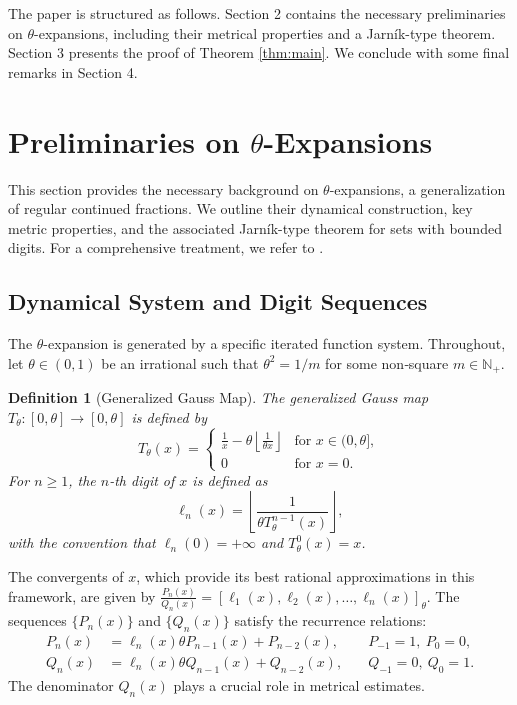 \documentclass{article}
\newtheorem{definition}[theorem]{Definition}
\numberwithin{equation}{section}
\begin{document}
The paper is structured as follows. Section 2 contains the necessary preliminaries on $\theta$-expansions, including their metrical properties and a Jarn\'ik-type theorem. Section 3 presents the proof of Theorem \ref{thm:main}. We conclude with some final remarks in Section 4.


\section{Preliminaries on $\theta$-Expansions}

This section provides the necessary background on $\theta$-expansions, a generalization of regular continued fractions. We outline their dynamical construction, key metric properties, and the associated Jarník-type theorem for sets with bounded digits. For a comprehensive treatment, we refer to \cite{SebeLascuCraiova,Sebe2017,SebeLascu2019,SebeLascu-Springer,SebeLascuBilel2}.

\subsection{Dynamical System and Digit Sequences}

The $\theta$-expansion is generated by a specific iterated function system.
{Throughout, let $\theta\in(0,1)$ be an irrational such that $\theta^2=1/m$ for some non‑square $m\in\mathbb{N}_+$.}

\begin{definition}[Generalized Gauss Map]
The generalized Gauss map $T_\theta: [0, \theta] \to [0, \theta]$ is defined by
\[
T_\theta(x) = \begin{cases}
\frac{1}{x} - \theta \left\lfloor \frac{1}{\theta x} \right\rfloor & \text{for } x \in (0, \theta], \\
0 & \text{for } x = 0.
\end{cases}
\]
For $n \geq 1$, the $n$-th digit of $x$ is defined as
\[
\ell_n(x) = \left\lfloor \frac{1}{\theta T_\theta^{n-1}(x)} \right\rfloor,
\]
{with the convention that $\ell_n(0) = +\infty$ and $T_\theta^0(x) = x$}. 
\end{definition}

The convergents of $x$, which provide its best rational approximations in this framework, are given by $\frac{P_n(x)}{Q_n(x)} = [\ell_1(x), \ell_2(x), \ldots, \ell_n(x)]_{\theta}$. 
The sequences $\{P_n(x)\}$ and $\{Q_n(x)\}$ satisfy the recurrence relations:
\begin{align*}
P_n(x) &= \ell_n(x)\theta P_{n-1}(x) + P_{n-2}(x), \quad &P_{-1} = 1,\ P_0 = 0, \\
Q_n(x) &= \ell_n(x)\theta Q_{n-1}(x) + Q_{n-2}(x), \quad & Q_{-1} = 0,\ Q_0 = 1.
\end{align*}
The denominator $Q_n(x)$ plays a crucial role in metrical estimates.
\end{document}
